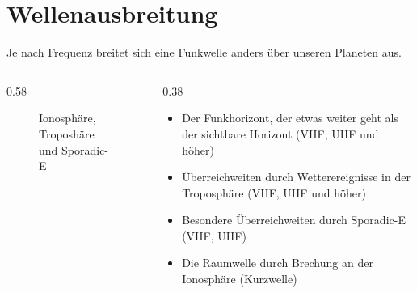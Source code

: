 
\section{Wellenausbreitung}
\label{section:wellenausbreitung}
\begin{frame}%
    Je nach Frequenz breitet sich eine Funkwelle anders über unseren Planeten aus.
    \begin{columns}
        \begin{column}{0.58\textwidth}
            \centering
            \begin{figure}
                \caption{\scriptsize Ionosphäre, Troposhäre und Sporadic-E}
                \label{n_ionosphäre}
            \end{figure}
        \end{column}
        \begin{column}{0.38\textwidth}
            \begin{itemize}
                 \item Der Funkhorizont, der etwas weiter geht als der sichtbare Horizont (VHF, UHF und höher)
                 \item Überreichweiten durch Wetterereignisse in der Troposphäre (VHF, UHF und höher)
                 \item Besondere Überreichweiten durch Sporadic-E (VHF, UHF)
                 \item Die Raumwelle durch Brechung an der Ionosphäre (Kurzwelle)
             \end{itemize}
         \end{column}
    \end{columns}

\end{frame}%
